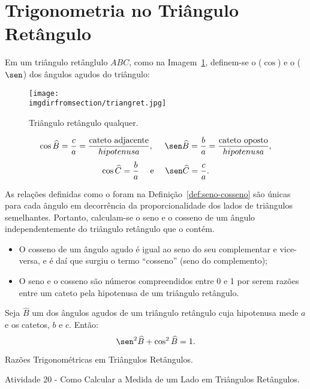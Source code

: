 \section{Trigonometria no Triângulo Retângulo}

\begin{definition}
\label{def:seno-cosseno}
Em um triângulo retânglulo $ABC$, como na Imagem~\ref{fig:triangulo-retangulo}, definem-se o
 ($\cos$) e o  ($\sen$) dos ângulos agudos do
triângulo:
%
\begin{figure}
\centering
\texttt{[image: \\imgdirfromsection/triangret.jpg]}
\caption{Triângulo retângulo qualquer.}
\label{fig:triangulo-retangulo}
\end{figure}
%
$$\cos \widehat B = \frac c a = \frac {\text{cateto
adjacente}}{hipotenusa}, \ \ \ \ \sen \widehat B = \frac b a = \frac
{\text{cateto oposto}}{hipotenusa},$$
$$\cos \widehat C = \frac b a \ \ \ \ \text{e} \ \ \ \ \sen \widehat
C = \frac c a.$$    
\end{definition}

\begin{remark}
As relações definidas como o foram na Definição~\ref{def:seno-cosseno} são únicas para cada ângulo em
decorrência da proporcionalidade dos lados de triângulos
semelhantes. Portanto, calculam-se o seno e o cosseno de um ângulo
independentemente do triângulo retângulo que o contém.
\end{remark}

\begin{proposition}
    \begin{itemize}
\item O cosseno de um ângulo agudo é igual ao seno do seu
complementar e vice-versa, e é daí que surgiu o termo ``cosseno'' (seno do
complemento);
\item O seno e o cosseno são números compreendidos entre 0 e 1 por
serem razões entre um cateto pela hipotenusa de um triângulo
retângulo.
\end{itemize}
\end{proposition}

\begin{proposition}
Seja $\widehat B$ um dos ângulos agudos de um triângulo retângulo
cuja hipotenusa mede $a$ e os catetos, $b$ e $c$. Então:
$$\sen^2 \widehat B + \cos^2 \widehat B = 1.$$
\end{proposition}

\begin{onlineact}
    {Razões Trigonométricas em Triângulos
Retângulos}.
\end{onlineact}

\begin{onlineact}
    {Atividade 20 - Como Calcular a Medida de um Lado em Triângulos
Retângulos}.
\end{onlineact}